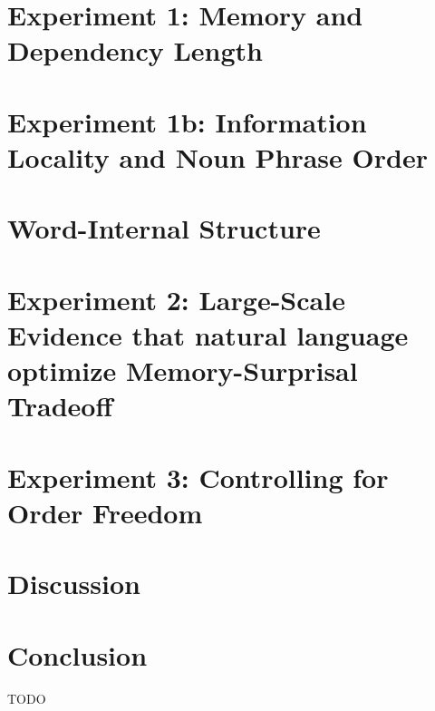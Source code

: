 \documentclass[11pt,letterpaper]{article}
\begin{document}


\section{Experiment 1: Memory and Dependency Length}



\section{Experiment 1b: Information Locality and Noun Phrase Order}



\section{Word-Internal Structure}



\section{Experiment 2: Large-Scale Evidence that natural language optimize Memory-Surprisal Tradeoff}



\section{Experiment 3: Controlling for Order Freedom}



\section{Discussion}




\section{Conclusion}

TODO




\end{document}
